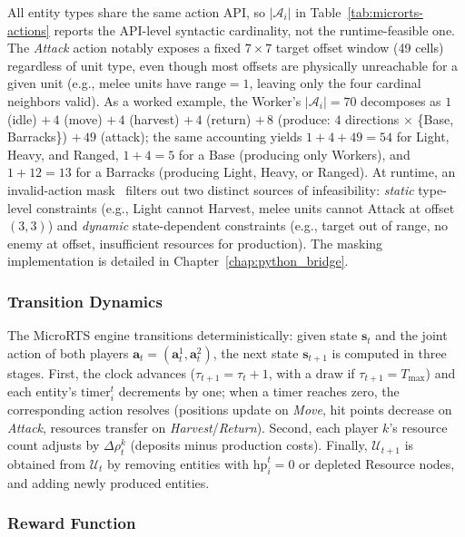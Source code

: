 \medskip

All entity types share the same action API, so $|\mathcal{A}_i|$ in Table~\ref{tab:microrts-actions} reports the API-level syntactic cardinality, not the runtime-feasible one. The \emph{Attack} action notably exposes a fixed $7{\times}7$ target offset window (49 cells) regardless of unit type, even though most offsets are physically unreachable for a given unit (e.g., melee units have $\mathrm{range}=1$, leaving only the four cardinal neighbors valid). As a worked example, the Worker's $|\mathcal{A}_i| = 70$ decomposes as $1$ (idle) $+\,4$ (move) $+\,4$ (harvest) $+\,4$ (return) $+\,8$ (produce: $4$ directions $\times$ \{Base, Barracks\}) $+\,49$ (attack); the same accounting yields $1 + 4 + 49 = 54$ for Light, Heavy, and Ranged, $1 + 4 = 5$ for a Base (producing only Workers), and $1 + 12 = 13$ for a Barracks (producing Light, Heavy, or Ranged). At runtime, an invalid-action mask~\cite{huangCloserLookInvalid2022} filters out two distinct sources of infeasibility: \emph{static} type-level constraints (e.g., Light cannot Harvest, melee units cannot Attack at offset $(3,3)$) and \emph{dynamic} state-dependent constraints (e.g., target out of range, no enemy at offset, insufficient resources for production). The masking implementation is detailed in Chapter~\ref{chap:python_bridge}.

\subsubsection{Transition Dynamics}

The MicroRTS engine transitions deterministically: given state $\boldsymbol{s}_t$ and the joint action of both players $\boldsymbol{a}_t = (\boldsymbol{a}_t^1, \boldsymbol{a}_t^2)$, the next state $\boldsymbol{s}_{t+1}$ is computed in three stages. First, the clock advances ($\tau_{t+1} = \tau_t + 1$, with a draw if $\tau_{t+1} = T_{\max}$) and each entity's $\mathrm{timer}^t_i$ decrements by one; when a timer reaches zero, the corresponding action resolves (positions update on \emph{Move}, hit points decrease on \emph{Attack}, resources transfer on \emph{Harvest}/\emph{Return}). Second, each player $k$'s resource count adjusts by $\Delta\rho_t^k$ (deposits minus production costs). Finally, $\mathcal{U}_{t+1}$ is obtained from $\mathcal{U}_t$ by removing entities with $\mathrm{hp}^t_i = 0$ or depleted Resource nodes, and adding newly produced entities.

\subsubsection{Reward Function}

